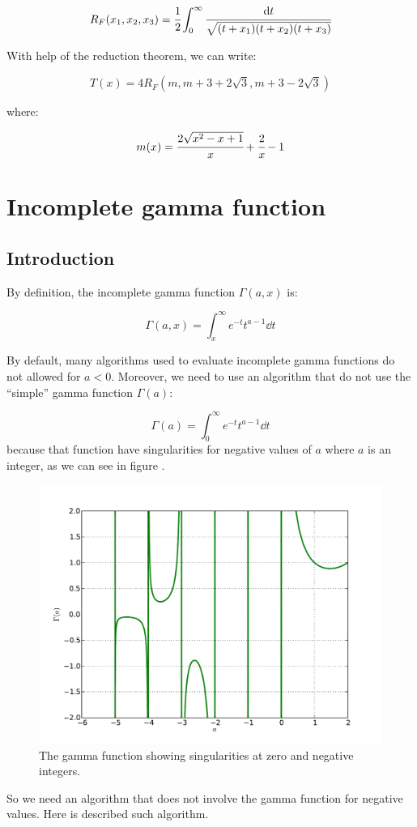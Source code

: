 \begin{equation}
    R_F(x_1,x_2,x_3)=
    \cfrac{1}{2}\int_0^\infty\cfrac{{\rm{d}}{t}}{\sqrt{(t+x_1)(t+x_2)(t+x_3)}}
\end{equation}

With help of the reduction theorem, we can write:

\begin{equation}
    T(x)=4R_F(m,m+3+2\sqrt{3},m+3-2\sqrt{3})
\end{equation}

where:

\begin{equation}
    m(x)=\cfrac{2\sqrt{x^2-x+1}}{x}+\cfrac{2}{x}-1
\end{equation}

\section{Incomplete gamma function}
\label{sec:gamma}

\subsection{Introduction}

By definition, the incomplete gamma function $\Gamma\left({a,x}\right)$ is:

\begin{equation}
    \Gamma\left({a,x}\right)=\int_x^\infty{e^{-t}{t^{a-1}}\dd{t}}
\end{equation}

By default, many algorithms used to evaluate incomplete gamma functions do not
allowed for $a<0$. Moreover, we need to use an algorithm that do not use the
``simple'' gamma function $\Gamma\left({a}\right)$:

\begin{equation}
    \Gamma\left({a}\right)=\int_0^\infty{e^{-t}{t^{a-1}}\dd{t}}
\end{equation}
%
because that function have singularities for negative values of $a$ where $a$
is an integer, as we can see in figure .
%
\begin{figure}[hbtp]
    \centering
    \includegraphics[width=0.5\linewidth]{figures/gamma/gamma}
    \caption{The gamma function showing singularities at zero and negative
    integers.\label{fig:gamma}}
\end{figure}
%
So we need an algorithm that does not involve the gamma function for
negative values. Here is described such algorithm.


